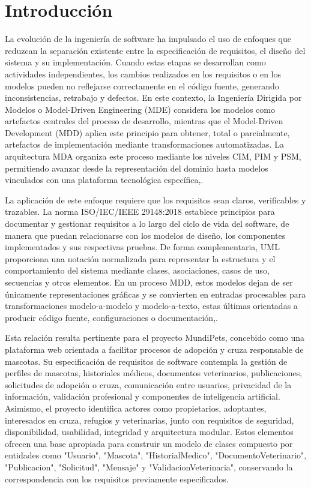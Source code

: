 \documentclass{article}
\begin{document}
\section{Introducción}
La evolución de la ingeniería de software ha impulsado el uso de enfoques que reduzcan la separación existente entre la especificación de requisitos, el diseño del sistema y su implementación. Cuando estas etapas se desarrollan como actividades independientes, los cambios realizados en los requisitos o en los modelos pueden no reflejarse correctamente en el código fuente, generando inconsistencias, retrabajo y defectos. En este contexto, la Ingeniería Dirigida por Modelos o Model-Driven Engineering (MDE) considera los modelos como artefactos centrales del proceso de desarrollo, mientras que el Model-Driven Development (MDD) aplica este principio para obtener, total o parcialmente, artefactos de implementación mediante transformaciones automatizadas. La arquitectura MDA organiza este proceso mediante los niveles CIM, PIM y PSM, permitiendo avanzar desde la representación del dominio hasta modelos vinculados con una plataforma tecnológica específica\cite{ISO_IEC_IEEE_29148_2018},\cite{OMG_MOFM2T_1_0}.

La aplicación de este enfoque requiere que los requisitos sean claros, verificables y trazables. La norma ISO/IEC/IEEE 29148:2018 establece principios para documentar y gestionar requisitos a lo largo del ciclo de vida del software, de manera que puedan relacionarse con los modelos de diseño, los componentes implementados y sus respectivas pruebas. De forma complementaria, UML proporciona una notación normalizada para representar la estructura y el comportamiento del sistema mediante clases, asociaciones, casos de uso, secuencias y otros elementos\cite{OMG_UML_2_5_1}. En un proceso MDD, estos modelos dejan de ser únicamente representaciones gráficas y se convierten en entradas procesables para transformaciones modelo-a-modelo y modelo-a-texto, estas últimas orientadas a producir código fuente, configuraciones o documentación\cite{OMG_MDA_Guide_2_0},\cite{OMG_UML_2_5_1}.

Esta relación resulta pertinente para el proyecto MundiPets, concebido como una plataforma web orientada a facilitar procesos de adopción y cruza responsable de mascotas. Su especificación de requisitos de software contempla la gestión de perfiles de mascotas, historiales médicos, documentos veterinarios, publicaciones, solicitudes de adopción o cruza, comunicación entre usuarios, privacidad de la información, validación profesional y componentes de inteligencia artificial. Asimismo, el proyecto identifica actores como propietarios, adoptantes, interesados en cruza, refugios y veterinarias, junto con requisitos de seguridad, disponibilidad, usabilidad, integridad y arquitectura modular. Estos elementos ofrecen una base apropiada para construir un modelo de clases compuesto por entidades como "Usuario", "Mascota", "HistorialMedico", "DocumentoVeterinario", "Publicacion", "Solicitud", "Mensaje" y "ValidacionVeterinaria", conservando la correspondencia con los requisitos previamente especificados.
\end{document}
